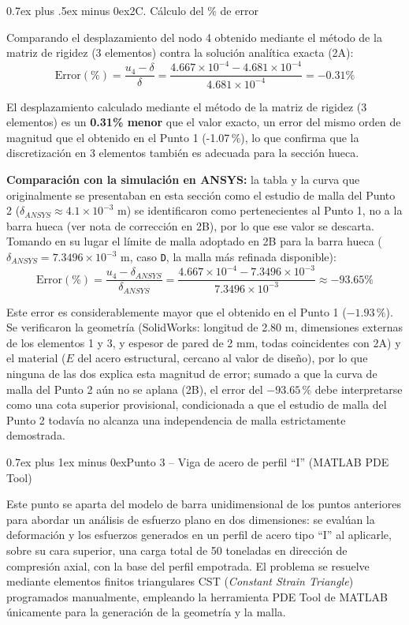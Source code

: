 \documentclass[conference]{IEEEtran}
\makeatletter
\def\section{\@startsection{section}{1}{\z@}{1.5ex plus 1.5ex minus 0.5ex}%
{0.7ex plus 1ex minus 0ex}{\normalfont\large\bfseries\centering\scshape}}%
\def\subsection{\@startsection{subsection}{2}{\z@}{1.5ex plus 1.5ex minus 0.5ex}%
{0.7ex plus .5ex minus 0ex}{\normalfont\normalsize\bfseries}}%
\makeatother
\begin{document}
\subsection{2C. Cálculo del \% de error}

Comparando el desplazamiento del nodo 4 obtenido mediante el método de la matriz de rigidez (3 elementos) contra la solución analítica exacta (2A):
\[
\text{Error}(\%)=\frac{u_4-\delta}{\delta}=\frac{4.667\times10^{-4}-4.681\times10^{-4}}{4.681\times10^{-4}}=-0.31\%
\]

El desplazamiento calculado mediante el método de la matriz de rigidez (3 elementos) es un \textbf{0.31\% menor} que el valor exacto, un error del mismo orden de magnitud que el obtenido en el Punto 1 (-1.07\,\%), lo que confirma que la discretización en 3 elementos también es adecuada para la sección hueca.

\textbf{Comparación con la simulación en ANSYS:} la tabla y la curva que originalmente se presentaban en esta sección como el estudio de malla del Punto 2 ($\delta_{ANSYS}\approx4.1\times10^{-3}$ m) se identificaron como pertenecientes al Punto 1, no a la barra hueca (ver nota de corrección en 2B), por lo que ese valor se descarta. Tomando en su lugar el límite de malla adoptado en 2B para la barra hueca ($\delta_{ANSYS}=7.3496\times10^{-3}$ m, caso \texttt{D}, la malla más refinada disponible):
\[
\text{Error}(\%)=\frac{u_4-\delta_{ANSYS}}{\delta_{ANSYS}}=\frac{4.667\times10^{-4}-7.3496\times10^{-3}}{7.3496\times10^{-3}}\approx-93.65\%
\]

Este error es considerablemente mayor que el obtenido en el Punto 1 ($-1.93\,\%$). Se verificaron la geometría (SolidWorks: longitud de 2.80 m, dimensiones externas de los elementos 1 y 3, y espesor de pared de 2 mm, todas coincidentes con 2A) y el material ($E$ del acero estructural, cercano al valor de diseño), por lo que ninguna de las dos explica esta magnitud de error; sumado a que la curva de malla del Punto 2 aún no se aplana (2B), el error del $-93.65\,\%$ debe interpretarse como una cota superior provisional, condicionada a que el estudio de malla del Punto 2 todavía no alcanza una independencia de malla estrictamente demostrada.

\section{Punto 3 -- Viga de acero de perfil ``I'' (MATLAB PDE Tool)}

Este punto se aparta del modelo de barra unidimensional de los puntos anteriores para abordar un análisis de esfuerzo plano en dos dimensiones: se evalúan la deformación y los esfuerzos generados en un perfil de acero tipo ``I'' al aplicarle, sobre su cara superior, una carga total de 50 toneladas en dirección de compresión axial, con la base del perfil empotrada. El problema se resuelve mediante elementos finitos triangulares CST (\textit{Constant Strain Triangle}) programados manualmente, empleando la herramienta PDE Tool de MATLAB únicamente para la generación de la geometría y la malla.
\end{document}
